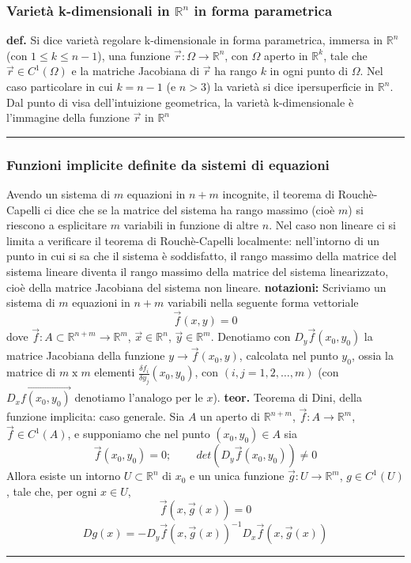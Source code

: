 \subsubsection{Varietà k-dimensionali in $\mathbb{R}^n$ in forma parametrica}
\textbf{def.} Si dice varietà regolare k-dimensionale in forma parametrica, immersa in $\mathbb{R}^n$ (con $1 \leq k \leq n-1$), una funzione $\vec{r} : \Omega \rightarrow \mathbb{R}^n$, con $\Omega$ aperto in $\mathbb{R}^k$, tale che $\vec{r} \in C^1(\Omega)$ e la matriche Jacobiana di $\vec{r}$ ha rango $k$ in ogni punto di $\Omega$.\newline
Nel caso particolare in cui $k = n-1$ (e $n > 3$) la varietà si dice ipersuperficie in $\mathbb{R}^n$.\newline
Dal punto di visa dell'intuizione geometrica, la varietà k-dimensionale è l'immagine della funzione $\vec{r}$ in $\mathbb{R}^n$\newline
\rule{\textwidth}{0,4pt}
\subsubsection{Funzioni implicite definite da sistemi di equazioni}
Avendo un sistema di $m$ equazioni in $n+m$ incognite, il teorema di Rouchè-Capelli ci dice che se la matrice del sistema ha rango massimo (cioè $m$) si riescono a esplicitare $m$ variabili in funzione di altre $n$. \newline
Nel caso non lineare ci si limita a verificare il teorema di Rouchè-Capelli localmente: nell'intorno di un punto in cui si sa che il sistema è soddisfatto, il rango massimo della matrice del sistema lineare diventa il rango massimo della matrice del sistema linearizzato, cioè della matrice Jacobiana del sistema non lineare.\newline
\newline
\textbf{notazioni:}\newline
Scriviamo un sistema di $m$ equazioni in $n+m$ variabili nella seguente forma vettoriale
\[
    \vec{f}(x, y) = 0
\]
dove $\vec{f}: A \subset \mathbb{R}^{n+m} \rightarrow \mathbb{R}^m$, $\vec{x} \in \mathbb{R}^n$, $\vec{y} \in \mathbb{R}^m$.\newline
Denotiamo con $D_y \vec{f}(x_0, y_0)$ la matrice Jacobiana della funzione $y \rightarrow \vec{f}(x_0, y)$, calcolata nel punto $y_0$, ossia la matrice di $m \; \text{x}\; m$ elementi $\frac{\delta f_i}{\delta y_j}(x_0, y_0)$, con $(i,j = 1, 2, \dots, m)$ (con $D_x \vec{f(x_0, y_0)}$ denotiamo l'analogo per le $x$).\newline
\newline
\textbf{teor.} Teorema di Dini, della funzione implicita: caso generale. \newline
Sia $A$ un aperto di $\mathbb{R}^{n+m}$, $\vec{f}: A \rightarrow \mathbb{R}^m$, $\vec{f} \in C^1(A)$, e supponiamo che nel punto $(x_0, y_0) \in A$ sia
\[
    \vec{f}(x_0, y_0) = 0 ; \;\;\;\;\;\;\;\;det(D_y \vec{f}(x_0, y_0)) \neq 0
\]
Allora esiste un intorno $U \subset \mathbb{R}^n$ di $x_0$ e un unica funzione $\vec{g} : U \rightarrow \mathbb{R}^m$, $g \in C^1(U)$, tale che, per ogni $x \in U$,
\[
    \vec{f} (x,\vec{g}(x)) = 0
\]
\[
    Dg(x) =-D_y \vec{f}(x,\vec{g}(x))^{-1}D_x \vec{f} (x, \vec{g}(x))
\]
\rule{\textwidth}{0,4pt}
